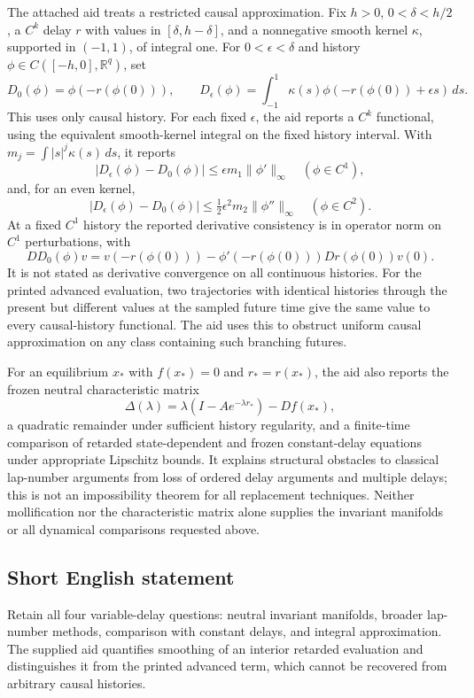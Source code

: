 \documentclass[11pt]{article}
\newcommand{\R}{\mathbb{R}}
\begin{document}
The attached aid treats a restricted causal approximation. Fix \(h>0\), \(0<\delta<h/2\), a \(C^k\) delay \(r\) with values in \([\delta,h-\delta]\), and a nonnegative smooth kernel \(\kappa\), supported in \((-1,1)\), of integral one. For \(0<\epsilon<\delta\) and history \(\phi\in C([-h,0],\R^q)\), set
\[
 D_0(\phi)=\phi(-r(\phi(0))),\qquad
 D_\epsilon(\phi)=\int_{-1}^1\kappa(s)\phi(-r(\phi(0))+\epsilon s)\,ds.
\]
This uses only causal history. For each fixed \(\epsilon\), the aid reports a \(C^k\) functional, using the equivalent smooth-kernel integral on the fixed history interval. With \(m_j=\int|s|^j\kappa(s)\,ds\), it reports
\[
 |D_\epsilon(\phi)-D_0(\phi)|\le\epsilon m_1\|\phi'\|_\infty\quad(\phi\in C^1),
\]
and, for an even kernel,
\[
 |D_\epsilon(\phi)-D_0(\phi)|\le\tfrac12\epsilon^2m_2\|\phi''\|_\infty\quad(\phi\in C^2).
\]
At a fixed \(C^1\) history the reported derivative consistency is in operator norm on \(C^1\) perturbations, with
\[
 DD_0(\phi)v=v(-r(\phi(0)))-\phi'(-r(\phi(0)))Dr(\phi(0))v(0).
\]
It is not stated as derivative convergence on all continuous histories. For the printed advanced evaluation, two trajectories with identical histories through the present but different values at the sampled future time give the same value to every causal-history functional. The aid uses this to obstruct uniform causal approximation on any class containing such branching futures.

For an equilibrium \(x_*\) with \(f(x_*)=0\) and \(r_*=r(x_*)\), the aid also reports the frozen neutral characteristic matrix
\[
 \Delta(\lambda)=\lambda(I-Ae^{-\lambda r_*})-Df(x_*),
\]
a quadratic remainder under sufficient history regularity, and a finite-time comparison of retarded state-dependent and frozen constant-delay equations under appropriate Lipschitz bounds. It explains structural obstacles to classical lap-number arguments from loss of ordered delay arguments and multiple delays; this is not an impossibility theorem for all replacement techniques. Neither mollification nor the characteristic matrix alone supplies the invariant manifolds or all dynamical comparisons requested above.
\subsection{Short English statement}
Retain all four variable-delay questions: neutral invariant manifolds, broader lap-number methods, comparison with constant delays, and integral approximation. The supplied aid quantifies smoothing of an interior retarded evaluation and distinguishes it from the printed advanced term, which cannot be recovered from arbitrary causal histories.
\end{document}
